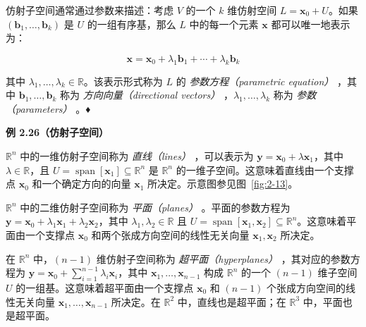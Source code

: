 仿射子空间通常通过参数来描述：考虑 $ V $ 的一个 $ k $ 维仿射空间 $ L = \boldsymbol{x}_0 + U $。如果 $ (\boldsymbol{b}_1, \ldots, \boldsymbol{b}_k) $ 是 $ U $ 的一组有序基，那么 $ L $ 中的每一个元素 $ \boldsymbol{x} $ 都可以唯一地表示为：

\begin{equation}
\boldsymbol{x} = \boldsymbol{x}_0 + \lambda_1 \boldsymbol{b}_1 + \cdots + \lambda_k \boldsymbol{b}_k
\tag{2.131}\label{eq:2-131}
\end{equation}

其中 $ \lambda_1, \ldots, \lambda_k \in \mathbb{R} $。该表示形式称为 $ L $ 的 \emph{参数方程（parametric equation）} ，其中 $ \boldsymbol{b}_1, \ldots, \boldsymbol{b}_k $ 称为 \emph{方向向量（directional vectors）} ，$ \lambda_1, \ldots, \lambda_k $ 称为 \emph{参数（parameters）} 。♦

\begin{notebox}
\textbf{例 2.26（仿射子空间）}
\end{notebox}

\begin{notebox}
$ \mathbb{R}^n $ 中的一维仿射子空间称为 \emph{直线（lines）} ，可以表示为 $ \boldsymbol{y} = \boldsymbol{x}_0 + \lambda \boldsymbol{x}_1 $，其中 $ \lambda \in \mathbb{R} $，且 $ U = \operatorname{span}[\boldsymbol{x}_1] \subseteq \mathbb{R}^n $ 是 $ \mathbb{R}^n $ 的一维子空间。这意味着直线由一个支撑点 $ \boldsymbol{x}_0 $ 和一个确定方向的向量 $ \boldsymbol{x}_1 $ 所决定。示意图参见图~\ref{fig:2-13}。
\end{notebox}

\begin{notebox}
$ \mathbb{R}^n $ 中的二维仿射子空间称为 \emph{平面（planes）} 。平面的参数方程为 $ \boldsymbol{y} = \boldsymbol{x}_0 + \lambda_1 \boldsymbol{x}_1 + \lambda_2 \boldsymbol{x}_2 $，其中 $ \lambda_1, \lambda_2 \in \mathbb{R} $ 且 $ U = \operatorname{span}[\boldsymbol{x}_1, \boldsymbol{x}_2] \subseteq \mathbb{R}^n $。这意味着平面由一个支撑点 $ \boldsymbol{x}_0 $ 和两个张成方向空间的线性无关向量 $ \boldsymbol{x}_1, \boldsymbol{x}_2 $ 所决定。
\end{notebox}

\begin{notebox}
在 $ \mathbb{R}^n $ 中，$ (n - 1) $ 维仿射子空间称为 \emph{超平面（hyperplanes）} ，其对应的参数方程为 $ \boldsymbol{y} = \boldsymbol{x}_0 + \sum_{i=1}^{n-1} \lambda_i \boldsymbol{x}_i $，其中 $ \boldsymbol{x}_1, \ldots, \boldsymbol{x}_{n-1} $ 构成 $ \mathbb{R}^n $ 的一个 $ (n - 1) $ 维子空间 $ U $ 的一组基。这意味着超平面由一个支撑点 $ \boldsymbol{x}_0 $ 和 $ (n - 1) $ 个张成方向空间的线性无关向量 $ \boldsymbol{x}_1, \ldots, \boldsymbol{x}_{n-1} $ 所决定。在 $ \mathbb{R}^2 $ 中，直线也是超平面；在 $ \mathbb{R}^3 $ 中，平面也是超平面。
\end{notebox}


